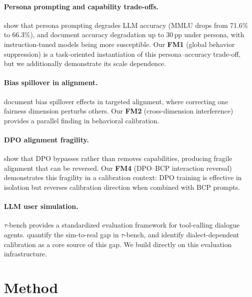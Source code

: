 \documentclass[11pt,a4paper]{article}
\newcommand{\fm}[1]{\textbf{FM#1}}
\newcommand{\pp}{\,pp}
\begin{document}
\paragraph{Persona prompting and capability trade-offs.}
\citet{basil2025playing_pretend} show that persona prompting degrades LLM accuracy (MMLU drops from 71.6\% to 66.3\%), and \citet{hu2026expert_persona} document accuracy degradation up to 30\pp{} under persona, with instruction-tuned models being more susceptible.
Our \fm{1} (global behavior suppression) is a task-oriented instantiation of this persona--accuracy trade-off, but we additionally demonstrate its scale dependence.

\paragraph{Bias spillover in alignment.}
\citet{gupta2026intra_fairness} document bias spillover effects in targeted alignment, where correcting one fairness dimension perturbs others.
Our \fm{2} (cross-dimension interference) provides a parallel finding in behavioral calibration.

\paragraph{DPO alignment fragility.}
\citet{lee2024dpo_toxicity} show that DPO bypasses rather than removes capabilities, producing fragile alignment that can be reversed.
Our \fm{4} (DPO--BCP interaction reversal) demonstrates this fragility in a calibration context: DPO training is effective in isolation but reverses calibration direction when combined with BCP prompts.

\paragraph{LLM user simulation.}
$\tau$-bench \citep{yao2024taubench} provides a standardized evaluation framework for tool-calling dialogue agents.
\citet{sim2real2026gap} quantify the sim-to-real gap in $\tau$-bench, and \citet{seshadri2026lost} identify dialect-dependent calibration as a core source of this gap.
We build directly on this evaluation infrastructure.

\section{Method}
\label{sec:method}
\end{document}
